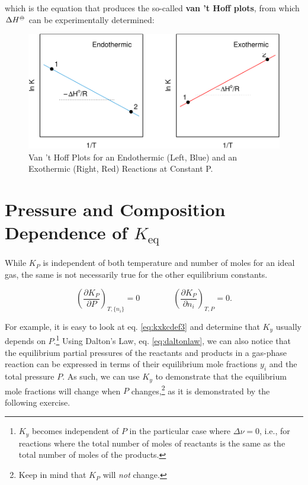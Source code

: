\documentclass[
  9pt,
]{extbook}
\theoremstyle{definition}
\theoremstyle{definition}
\theoremstyle{definition}
\theoremstyle{remark}
\begin{document}
which is the equation that produces the so-called \textbf{van 't Hoff plots}, from which \(\Delta H^{-\kern-6pt{\ominus}\kern-6pt-}\) can be experimentally determined:

\begin{figure}

{\centering \includegraphics{pchem1_files/figure-latex/vthoffplt-1} 

}

\caption{Van 't Hoff Plots for an Endothermic (Left, Blue) and an Exothermic (Right, Red) Reactions at Constant P.}\label{fig:vthoffplt}
\end{figure}

\hypertarget{pressure-and-composition-dependence-of-k_texteq}{%
\section{\texorpdfstring{Pressure and Composition Dependence of \(K_{\text{eq}}\)}{Pressure and Composition Dependence of K\_\{\textbackslash text\{eq\}\}}}\label{pressure-and-composition-dependence-of-k_texteq}}

While \(K_P\) is independent of both temperature and number of moles for an ideal gas, the same is not necessarily true for the other equilibrium constants.

\begin{equation}
\left( \frac{\partial K_P}{\partial P} \right)_{T,\{n_i\}} = 0 \qquad \qquad \left( \frac{\partial K_P}{\partial n_i} \right)_{T,P} =0.
\label{eq:kppni}
\end{equation}

For example, it is easy to look at eq. \eqref{eq:kxkcdef3} and determine that \(K_y\) usually depends on \(P\).\footnote{\(K_y\) becomes independent of \(P\) in the particular case where \(\Delta \nu=0\), i.e., for reactions where the total number of moles of reactants is the same as the total number of moles of the products.} Using Dalton's Law, eq. \eqref{eq:daltonlaw}, we can also notice that the equilibrium partial pressures of the reactants and products in a gas-phase reaction can be expressed in terms of their equilibrium mole fractions \(y_i\) and the total pressure \(P\). As such, we can use \(K_y\) to demonstrate that the equilibrium mole fractions will change when \(P\) changes,\footnote{Keep in mind that \(K_P\) will \emph{not} change.} as it is demonstrated by the following exercise.
\end{document}

